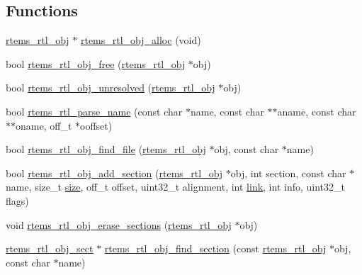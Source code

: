 \subsection*{Functions}
\begin{DoxyCompactItemize}
\item 
\mbox{\hyperlink{structrtems__rtl__obj}{rtems\+\_\+rtl\+\_\+obj}} $\ast$ \mbox{\hyperlink{rtl-obj_8c_a680decdef583cdfa336e9adc86c71e87}{rtems\+\_\+rtl\+\_\+obj\+\_\+alloc}} (void)
\item 
bool \mbox{\hyperlink{rtl-obj_8c_a7385d2d95fc68a554aac41f11fb2248d}{rtems\+\_\+rtl\+\_\+obj\+\_\+free}} (\mbox{\hyperlink{structrtems__rtl__obj}{rtems\+\_\+rtl\+\_\+obj}} $\ast$obj)
\item 
bool \mbox{\hyperlink{rtl-obj_8c_a63170089dcc2fbe5453fe01659c99616}{rtems\+\_\+rtl\+\_\+obj\+\_\+unresolved}} (\mbox{\hyperlink{structrtems__rtl__obj}{rtems\+\_\+rtl\+\_\+obj}} $\ast$obj)
\item 
bool \mbox{\hyperlink{rtl-obj_8c_a783aed59695cd068d8cb244655fdca76}{rtems\+\_\+rtl\+\_\+parse\+\_\+name}} (const char $\ast$name, const char $\ast$$\ast$aname, const char $\ast$$\ast$oname, off\+\_\+t $\ast$ooffset)
\item 
bool \mbox{\hyperlink{rtl-obj_8c_a01178159b33ae5e8a94b77f5f2fd6aa9}{rtems\+\_\+rtl\+\_\+obj\+\_\+find\+\_\+file}} (\mbox{\hyperlink{structrtems__rtl__obj}{rtems\+\_\+rtl\+\_\+obj}} $\ast$obj, const char $\ast$name)
\item 
bool \mbox{\hyperlink{rtl-obj_8c_a08fe8380ba12aee966bd18675becf6cd}{rtems\+\_\+rtl\+\_\+obj\+\_\+add\+\_\+section}} (\mbox{\hyperlink{structrtems__rtl__obj}{rtems\+\_\+rtl\+\_\+obj}} $\ast$obj, int section, const char $\ast$name, size\+\_\+t \mbox{\hyperlink{sun4u_2tte_8h_a245260f6f74972558f61b85227df5aae}{size}}, off\+\_\+t offset, uint32\+\_\+t alignment, int \mbox{\hyperlink{link_8c_a8c94afd0b7e5bb4ce95fefd964241f7f}{link}}, int info, uint32\+\_\+t flags)
\item 
void \mbox{\hyperlink{rtl-obj_8c_a35b64d2ab1e6c8fa1a82dfa0a14ea1e0}{rtems\+\_\+rtl\+\_\+obj\+\_\+erase\+\_\+sections}} (\mbox{\hyperlink{structrtems__rtl__obj}{rtems\+\_\+rtl\+\_\+obj}} $\ast$obj)
\item 
\mbox{\hyperlink{structrtems__rtl__obj__sect}{rtems\+\_\+rtl\+\_\+obj\+\_\+sect}} $\ast$ \mbox{\hyperlink{rtl-obj_8c_ace58c2df49449c7973236afeb1365c9c}{rtems\+\_\+rtl\+\_\+obj\+\_\+find\+\_\+section}} (const \mbox{\hyperlink{structrtems__rtl__obj}{rtems\+\_\+rtl\+\_\+obj}} $\ast$obj, const char $\ast$name)
\item 

\end{DoxyCompactItemize}
